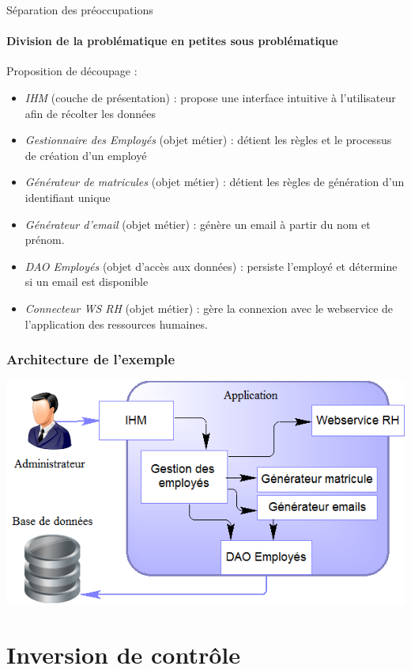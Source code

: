 \documentclass[compress]{beamer}%
\begin{document}
\begin{frame}{Séparation des préoccupations}
	\framesubtitle{Division de la problématique en petites sous problématique}
	
	Proposition de découpage :
	\pause
	\begin{itemize}[<+->]
	\item \emph{IHM} (couche de présentation) : propose une interface intuitive à l'utilisateur afin de récolter les données
	\item \emph{Gestionnaire des Employés} (objet métier) : détient les règles et le processus de création d'un employé
	\item \emph{Générateur de matricules} (objet métier) : détient les règles de génération d'un identifiant unique
	\item \emph{Générateur d'email} (objet métier) : génère un email à partir du nom et prénom.
	\item \emph{DAO Employés} (objet d'accès aux données) : persiste l'employé et détermine si un email est disponible
	\item \emph{Connecteur WS RH} (objet métier) : gère la connexion avec le webservice de l'application des ressources humaines.
	\end{itemize}
	
\end{frame}

\begin{frame}
	\frametitle{Architecture de l'exemple}
	
	\begin{center}	
	\includegraphics[width=\textwidth]{images/spring_usecase.png}
	\end{center}
\end{frame}
	

\section{Inversion de contrôle}
\end{document}
